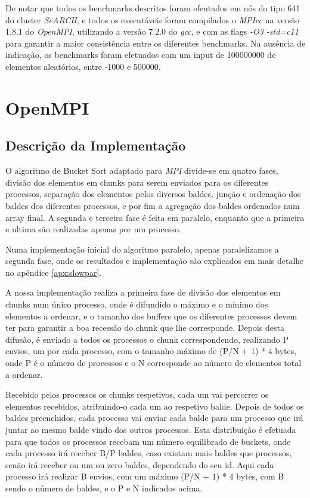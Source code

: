 \documentclass[a4paper]{report}
\begin{document}
De notar que todos os benchmarks descritos foram efeutados em nós do tipo 641 do
cluster \textit{SeARCH}, e todos os executáveis foram compilados o
\textit{MPIcc} na versão 1.8.1 do \textit{OpenMPI}, utilizando a versão
7.2.0 do \textit{gcc}, e com as flags \textit{-O3 -std=c11} para garantir
a maior consistência entre os diferentes benchmarks. Na
ausência de indicação, os benchmarks foram efetuados com um input de 100000000
de elementos aleatórios, entre -1000 e 500000.

\chapter{OpenMPI} \label{chap:ompi}

\section{Descrição da Implementação}
O algoritmo de Bucket Sort adaptado para \textit{MPI} divide-se em quatro fases,
divisão dos elementos em chunks para serem enviados para os diferentes
processos, separação dos elementos pelos diversos baldes, junção e ordenação dos
baldes dos diferentes processos, e por fim a agregação dos baldes ordenados num
array final. A segunda e terceira fase é feita em paralelo, enquanto que a
primeira e ultima são realizadas apenas por um processo.

Numa implementação inicial do algoritmo paralelo, apenas paralelizamos a
segunda fase, onde os resultados e implementação são explicados em mais detalhe
no apêndice \ref{apx:slowpar}.

A nossa implementação realiza a primeira fase de divisão dos elementos em chunks
num único processo, onde é difundido o máximo e o mínimo dos elementos a
ordenar, e o tamanho dos buffers que os diferentes processos devem ter para
garantir a boa recessão do chunk que lhe corresponde. Depois desta difusão, é
enviado a todos os processos o chunk correspondendo, realizando P envios, um por
cada processo, com o tamanho máximo de (P/N + 1) * 4 bytes, onde P é o número de
processos e o N corresponde ao número de elementos total a ordenar.

Recebido pelos processos os chunks respetivos, cada um vai percorrer os
elementos recebidos, atribuindo-o cada um ao respetivo balde. Depois de todos os
baldes preenchidos, cada processo vai enviar cada balde para um processo que
irá juntar ao mesmo balde vindo dos outros processos. Esta distribuição é
efetuada para que todos os processos recebam um número equilibrado de
buckets, onde cada processo irá receber B/P baldes, caso existam mais baldes
que processos, senão irá receber ou um ou zero baldes, dependendo do seu id.
Aqui cada processo irá realizar B envios, com um máximo (P/N + 1) * 4 bytes,
com B sendo o número de baldes, e o P e N indicados acima.
\end{document}
